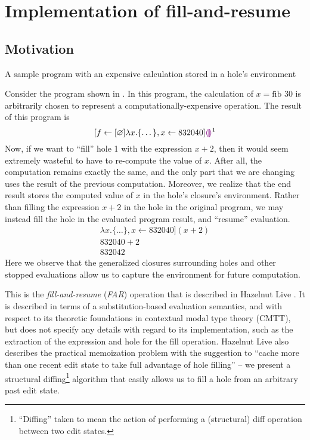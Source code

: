 \chapter{Implementation of fill-and-resume}
\label{sec:far_impl}

\section{Motivation}
\label{sec:far-motivation}

\begin{listing}
  \centering
  \caption{A sample program with an expensive calculation stored in a hole's environment}
  \label{fig:far-motivation}
\end{listing}

Consider the program shown in . In this program, the calculation of $x=\text{fib }30$ is arbitrarily chosen to represent a computationally-expensive operation. The result of this program is \[
  [f\leftarrow [\varnothing]\lambda x.\{\dots\},x\leftarrow 832040]\textcolor{violet}{\llparenthesis}\textcolor{violet}{\rrparenthesis}^1
\]
Now, if we want to ``fill'' hole 1 with the expression $x+2$, then it would seem extremely wasteful to have to re-compute the value of $x$. After all, the computation remains exactly the same, and the only part that we are changing uses the result of the previous computation. Moreover, we realize that the end result stores the computed value of $x$ in the hole's closure's environment. Rather than filling the expression $x+2$ in the hole in the original program, we may instead fill the hole in the evaluated program result, and ``resume'' evaluation.
\begin{gather*}
  [f\leftarrow [\varnothing]\lambda x.\{\dots\},x\leftarrow 832040](x+2) \\
  832040+2 \\
  832042
\end{gather*}
Here we observe that the generalized closures surrounding holes and other stopped evaluations allow us to capture the environment for future computation.

This is the \textit{fill-and-resume} (\textit{FAR}) operation that is described in Hazelnut Live \cite{conf/popl/HazelnutLive19}. It is described in terms of a substitution-based evaluation semantics, and with respect to its theoretic foundations in contextual modal type theory (CMTT), but does not specify any details with regard to its implementation, such as the extraction of the expression and hole for the fill operation. Hazelnut Live also describes the practical memoization problem with the suggestion to ``cache more than one recent edit state to take full advantage of hole filling'' -- we present a structural diffing\footnote{``Diffing'' taken to mean the action of performing a (structural) diff operation between two edit states.} algorithm that easily allows us to fill a hole from an arbitrary past edit state.

